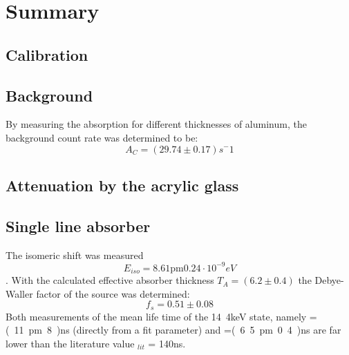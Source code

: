 \section{Summary}
\subsection{Calibration}

\subsection{Background}
By measuring the absorption for different thicknesses of aluminum, the background count rate was determined to be:
\begin{equation*}
A_C= (29.74\pm0.17)s^-1
\end{equation*}	
\subsection{Attenuation by the acrylic glass}

\subsection{Single line absorber}
The isomeric shift was measured\begin{equation*}
E_{iso}= \unit{8.61\pm0.24\cdot10^{-9}}{eV}
\end{equation*}. 
With the calculated effective absorber thickness $T_A=(6.2\pm0.4)$ the Debye-Waller factor of the source was determined:
\begin{equation*}
f_s=0.51\pm0.08
\end{equation*}
Both measurements of the mean life time of the \unit{14.4}{keV} state, namely \scalebox{1.5}{$\tau$}=\unit{(11\pm8)}{ns} (directly from a fit parameter) and \scalebox{1.5}{$\tau$}=\unit{(6.5\pm0.4)}{ns} are far lower than the literature value \scalebox{1.5}{$\tau$}$_{lit}$ = \unit{140}{ns}.


